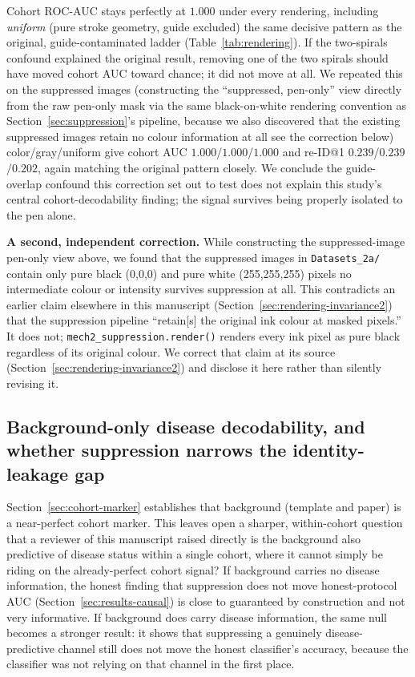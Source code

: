 \documentclass[3p,final,10pt]{elsarticle}
\let\oldsubsection\subsection
\renewcommand{\subsection}{\FloatBarrier\oldsubsection}
\begin{document}
Cohort ROC-AUC stays perfectly at $1.000$ under every rendering, including
\textit{uniform} (pure stroke geometry, guide excluded) the same
decisive pattern as the original, guide-contaminated ladder
(Table~\ref{tab:rendering}). If the two-spirals confound explained the
original result, removing one of the two spirals should have moved cohort
AUC toward chance; it did not move at all. We repeated this on the
suppressed images (constructing the ``suppressed, pen-only'' view directly
from the raw pen-only mask via the same black-on-white rendering
convention as Section~\ref{sec:suppression}'s pipeline, because we also
discovered that the existing suppressed images retain no colour
information at all see the correction below) color/gray/uniform give
cohort AUC $1.000$/$1.000$/$1.000$ and re-ID@1 $0.239$/$0.239$/$0.202$,
again matching the original pattern closely. We conclude the guide-overlap
confound this correction set out to test does not explain this study's
central cohort-decodability finding; the signal survives being properly
isolated to the pen alone.

\textbf{A second, independent correction.} While constructing the
suppressed-image pen-only view above, we found that the suppressed images
in \texttt{Datasets\_2a/} contain only pure black (0,0,0) and pure white
(255,255,255) pixels no intermediate colour or intensity survives
suppression at all. This contradicts an earlier claim elsewhere in this
manuscript (Section~\ref{sec:rendering-invariance2}) that the suppression
pipeline ``retain[s] the original ink colour at masked pixels.'' It does
not; \texttt{mech2\_suppression.render()} renders every ink pixel as pure
black regardless of its original colour. We correct that claim at its
source (Section~\ref{sec:rendering-invariance2}) and disclose it here
rather than silently revising it.

\subsection{Background-only disease decodability, and whether suppression narrows the identity-leakage gap}
\label{sec:background-disease}
Section~\ref{sec:cohort-marker} establishes that background (template and paper)
is a near-perfect cohort marker. This leaves open a sharper,
within-cohort question that a reviewer of this manuscript raised directly
is the background also predictive of disease status within a single
cohort, where it cannot simply be riding on the already-perfect
cohort signal? If background carries no disease information, the honest
finding that suppression does not move honest-protocol AUC
(Section~\ref{sec:results-causal}) is close to guaranteed by construction
and not very informative. If background does carry disease
information, the same null becomes a stronger result: it shows that
suppressing a genuinely disease-predictive channel still does not move the
honest classifier's accuracy, because the classifier was not relying on
that channel in the first place.
\end{document}
